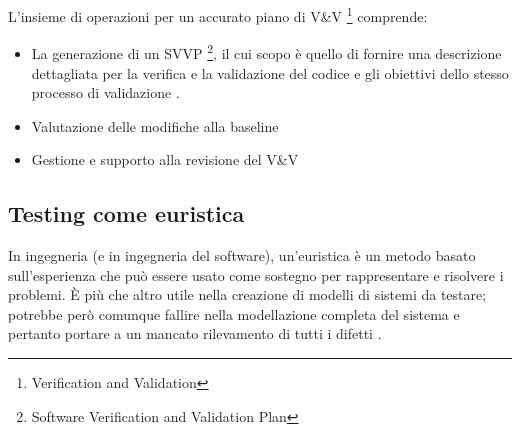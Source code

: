 \documentclass[../main.tex]{subfiles}
\begin{document}
L'insieme di operazioni per un accurato piano di V\&V \footnote{Verification and Validation} comprende:
\begin{itemize}
\item La generazione di un SVVP \footnote{Software Verification and Validation Plan}, il cui scopo è quello di fornire una descrizione dettagliata per la verifica e la validazione del codice e gli obiettivi dello stesso processo di validazione \cite{ieee1012}.
\item Valutazione delle modifiche alla baseline
\item Gestione e supporto alla revisione del V\&V
\end{itemize}

\subsection{Testing come euristica}
In ingegneria (e in ingegneria del software), un'euristica è un metodo basato sull'esperienza che può essere usato come sostegno per rappresentare e risolvere i problemi. È più che altro utile nella creazione di modelli di sistemi da testare; potrebbe però comunque fallire nella modellazione completa del sistema e pertanto portare a un mancato rilevamento di tutti i difetti \cite{iso29119}.
\end{document}
